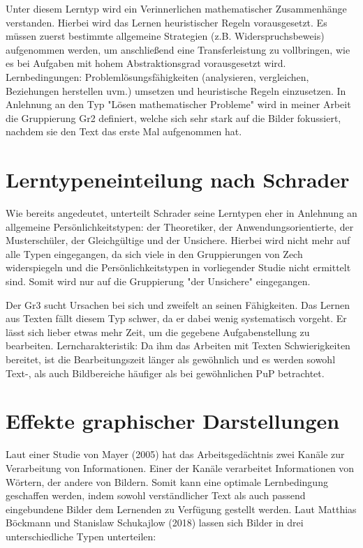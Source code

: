 Unter diesem Lerntyp wird ein Verinnerlichen mathematischer Zusammenhänge verstanden. Hierbei wird das Lernen heuristischer Regeln vorausgesetzt. Es müssen zuerst bestimmte allgemeine Strategien (z.B. Widerspruchsbeweis) aufgenommen werden, um anschließend eine Transferleistung zu vollbringen, wie es bei Aufgaben mit hohem Abstraktionsgrad vorausgesetzt wird. 
Lernbedingungen: Problemlösungsfähigkeiten (analysieren, vergleichen, Beziehungen herstellen uvm.) umsetzen und heuristische Regeln einzusetzen.
In Anlehnung an den Typ "Lösen mathematischer Probleme" wird in meiner Arbeit die Gruppierung \gls{Gr2} definiert, welche sich sehr stark auf die Bilder fokussiert, nachdem sie den Text das erste Mal aufgenommen hat\cite{zech1983grundkurs}.

\section{Lerntypeneinteilung nach Schrader}

Wie bereits angedeutet, unterteilt Schrader seine Lerntypen eher in Anlehnung an allgemeine Persönlichkeitstypen: der Theoretiker, der Anwendungsorientierte, der Musterschüler, der Gleichgültige und der Unsichere. Hierbei wird nicht mehr auf alle Typen eingegangen, da sich viele in den Gruppierungen von Zech widerspiegeln und die Persönlichkeitstypen in vorliegender Studie nicht ermittelt sind. Somit wird nur auf die Gruppierung "der Unsichere" eingegangen.

Der \gls{Gr3} sucht Ursachen bei sich und zweifelt an seinen Fähigkeiten. Das Lernen aus Texten fällt diesem Typ schwer, da er dabei wenig systematisch vorgeht. Er lässt sich lieber etwas mehr Zeit, um die gegebene Aufgabenstellung zu bearbeiten.
Lerncharakteristik: Da ihm das Arbeiten mit Texten Schwierigkeiten bereitet, ist die Bearbeitungszeit länger als gewöhnlich und es werden sowohl Text-, als auch Bildbereiche häufiger als bei gewöhnlichen \gls{PuP} betrachtet\cite{schrader2008lerntypen}. 

\section{Effekte graphischer Darstellungen}

Laut einer Studie von Mayer (2005) hat das Arbeitsgedächtnis zwei Kanäle zur Verarbeitung von Informationen. Einer der Kanäle verarbeitet Informationen von Wörtern, der andere von Bildern\cite{mayer2005reliability}. Somit kann eine optimale Lernbedingung geschaffen werden, indem sowohl verständlicher Text als auch passend eingebundene Bilder dem Lernenden zu Verfügung gestellt werden. Laut Matthias Böckmann und Stanislaw Schukajlow (2018) lassen sich Bilder in drei unterschiedliche Typen unterteilen:
    
